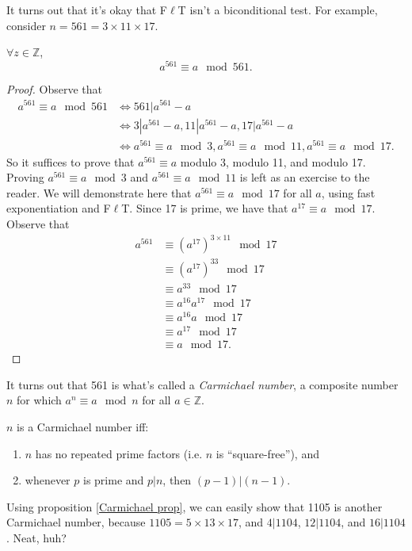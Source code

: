 It turns out that it's okay that F$\ell$T isn't a biconditional test. For example, consider $n=561 = 3 \times 11 \times 17$.

\begin{example} $\forall z \in \mathbb Z$, $$a^{561} \equiv a \mod 561.$$ \end{example}
\begin{proof}
Observe that
\begin{align*}
a^{561} \equiv a \mod 561 &\iff 561 | a^{561}-a \\
&\iff 3|a^{561}-a, 11|a^{561}-a, 17|a^{561}-a \\
&\iff a^{561} \equiv a \mod 3, a^{561} \equiv a \mod 11, a^{561} \equiv a \mod 17.
\end{align*}
So it suffices to prove that $a^{561} \equiv a$ modulo 3, modulo 11, and modulo 17. Proving $a^{561} \equiv a \mod 3$ and $a^{561} \equiv a \mod 11$ is left as an exercise to the reader. We will demonstrate here that $a^{561} \equiv a \mod 17$ for all $a$, using fast exponentiation and F$\ell$T. Since 17 is prime, we have that $a^{17} \equiv a \mod 17$. Observe that 
\begin{align*}
a^{561} &\equiv \left(a^{17}\right)^{3\times11} \mod 17 \\
&\equiv \left(a^{17}\right)^{33} \mod 17 \\
&\equiv a^{33} \mod 17 \\
&\equiv a^{16}a^{17} \mod 17 \\
&\equiv a^{16}a\mod 17 \\
&\equiv a^{17} \mod 17 \\
&\equiv a \mod 17.
\end{align*}
\end{proof}

It turns out that 561 is what's called a \emph{Carmichael number}, a composite number $n$ for which $a^n \equiv a \mod n$ for all $a \in \mathbb Z$. 

\begin{proposition} \label{Carmichael prop} $n$ is a Carmichael number iff:
\begin{enumerate}
\item $n$ has no repeated prime factors (i.e. $n$ is ``square-free''), and 
\item whenever $p$ is prime and $p|n$, then $(p-1)|(n-1)$. 
\end{enumerate}
\end{proposition}

\begin{example} Using proposition \ref{Carmichael prop}, we can easily show that 1105 is another Carmichael number, because $1105 = 5 \times 13 \times 17$, and $4|1104$, $12|1104$, and $16|1104$. Neat, huh? \end{example}

